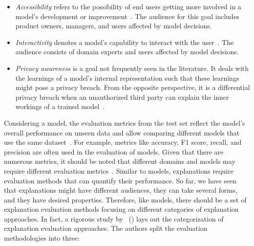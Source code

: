\begin{itemize}
    \item \emph{Accessibility} refers to the possibility of end users getting more involved in a model's development or improvement~\parencite{XAI_BewareInmatesRunningTheAsylum_Miller}. The audience for this goal includes product owners, managers, and users affected by model decisions.
    \item \emph{Interactivity} denotes a model's capability to interact with the user~\parencite{InteractiveAndInterpretableMLModels_Kim}. The audience consists of domain experts and users affected by model decisions.
    \item \emph{Privacy awareness} is a goal not frequently seen in the literature. It deals with the learnings of a model's internal representation such that these learnings might pose a privacy breach. From the opposite perspective, it is a differential privacy breach when an unauthorized third party can explain the inner workings of a trained model~\parencite{XAIConceptsTaxonomies_Arrieta}.
\end{itemize}
Considering a model, the evaluation metrics from the test set reflect the model's overall performance on unseen data and allow comparing different models that use the same dataset~\parencite{PMLB_Olson}. For example, metrics like accuracy, F1 score, recall, and precision are often used in the evaluation of models. Given that there are numerous metrics, it should be noted that different domains and models may require different evaluation metrics~\parencite{BeingAccurateIsNotEnough_McNee, AReviewOnEvaluationMetrics_Hossin, PeeringIntoTheBlackBoxOfAI_Handelman}.
Similar to models, explanations require evaluation methods that can quantify their performance. So far, we have seen that explanations might have different audiences, they can take several forms, and they have desired properties. Therefore, like models, there should be a set of explanation evaluation methods focusing on different categories of explanation approaches. In fact, a rigorous study by~\citeauthor{TowardsARigorousScienceML_Velez} (\citeyear{TowardsARigorousScienceML_Velez}) lays out the categorization of explanation evaluation approaches. The authors split the evaluation methodologies into three:
